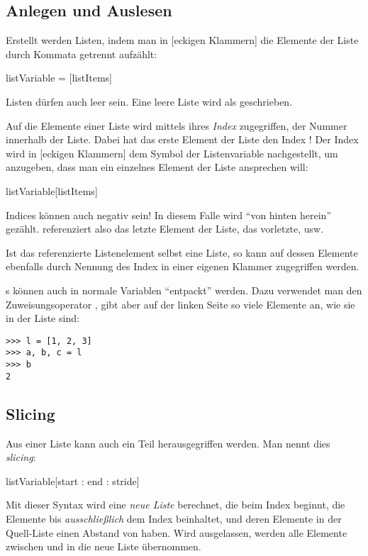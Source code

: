 \subsection{Anlegen und Auslesen}
Erstellt werden Listen, indem man in [eckigen Klammern] die Elemente der Liste durch Kommata getrennt aufzählt:
\begin{codebox}
listVariable = [listItems]
\end{codebox}

Listen dürfen auch leer sein. Eine leere Liste wird als \inPy{[]} geschrieben.

Auf die Elemente einer Liste wird mittels ihres \emph{Index} zugegriffen, \ie der Nummer innerhalb der Liste. Dabei hat das erste Element der Liste den Index ! Der Index wird in [eckigen Klammern] dem Symbol der Listenvariable nachgestellt, um anzugeben, dass man ein einzelnes Element der Liste ansprechen will:

\begin{codebox}
listVariable[listItems]
\end{codebox}

Indices können auch negativ sein! In diesem Falle wird \enquote{von hinten herein} gezählt.  referenziert also das letzte Element der Liste,  das vorletzte, usw.

Ist das referenzierte Listenelement selbst eine Liste, so kann auf dessen Elemente ebenfalls durch Nennung des Index in einer eigenen Klammer zugegriffen werden.

s können auch in normale Variablen \enquote{entpackt} werden. Dazu verwendet man den Zuweisungsoperator \inPy{=}, gibt aber auf der linken Seite so viele Elemente an, wie sie in der Liste sind:
\begin{cmdbox}
\begin{verbatim}
>>> l = [1, 2, 3]
>>> a, b, c = l
>>> b
2
\end{verbatim}
\end{cmdbox}


\subsection{Slicing}
Aus einer Liste kann auch ein Teil herausgegriffen werden. Man nennt dies \emph{slicing}:
\begin{codebox}
listVariable[start : end : stride]
\end{codebox}
Mit dieser Syntax wird eine \emph{neue Liste} berechnet, die beim Index  beginnt, die Elemente bis \emph{ausschließlich} dem Index  beinhaltet, und deren Elemente in der Quell-Liste einen Abstand von  haben. Wird  ausgelassen, werden alle Elemente zwischen  und  in die neue Liste übernommen.

